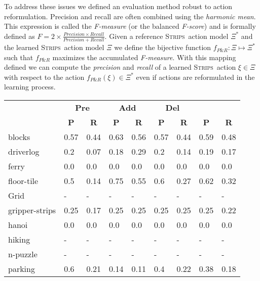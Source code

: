 \documentclass{article}
\newcommand{\strips}{\textsc{Strips}}     %
\begin{document}
To address these issues we defined an evaluation method robust to action reformulation. Precision and recall are often combined using the {\em harmonic mean}. This expression is called the {\em F-measure} (or the balanced {\em F-score}) and is formally defined as $F=2\times\frac{Precision\times Recall}{Precision+Recall}$. Given a reference \strips\ action model $\Xi^*$ and the learned \strips\ action model $\Xi$ we define the bijective function $f_{P\&R}:\Xi \mapsto \Xi^*$ such that $f_{P\&R}$ maximizes the accumulated {\em F-measure}. With this mapping defined we can compute the {\em precision} and {\em recall} of a learned \strips\ action $\xi\in\Xi$ with respect to the action $f_{P\&R}(\xi)\in \Xi^*$ even if actions are reformulated in the learning process.

\begin{table}
	\begin{center}
		\begin{scriptsize}                
			\begin{tabular}{l|l|l|l|l|l|l||l|l|}
				& \multicolumn{2}{|c|}{\bf Pre} & \multicolumn{2}{|c|}{\bf Add} & \multicolumn{2}{|c||}{\bf Del} & \multicolumn{2}{|c}{\bf}\\ \cline{2-9}			
				& \multicolumn{1}{|c|}{\bf P} & \multicolumn{1}{|c|}{\bf R} & \multicolumn{1}{|c|}{\bf P} & \multicolumn{1}{|c|}{\bf R} & \multicolumn{1}{|c|}{\bf P} & \multicolumn{1}{|c||}{\bf R} &  \multicolumn{1}{|c|}{\bf P} & \multicolumn{1}{|c|}{\bf R} \\
				\hline
				blocks & 0.57 & 0.44 & 0.63 & 0.56 & 0.57 & 0.44 & 0.59 & 0.48 \\
				driverlog & 0.2 & 0.07 & 0.18 & 0.29 & 0.2 & 0.14 & 0.19 & 0.17 \\
				ferry & 0.0 & 0.0 & 0.0 & 0.0 & 0.0 & 0.0 & 0.0 & 0.0 \\
				floor-tile & 0.5 & 0.14 & 0.75 & 0.55 & 0.6 & 0.27 & 0.62 & 0.32 \\
				Grid & - & - & - & - & - & - & - & - \\ %
				gripper-strips & 0.25 & 0.17 & 0.25 & 0.25 & 0.25 & 0.25 & 0.25 & 0.22 \\
				hanoi & 0.0 & 0.0 & 0.0 & 0.0 & 0.0 & 0.0 & 0.0 & 0.0 \\
				hiking & - & - & - & - & - & - & - & - \\ %
				n-puzzle & - & - & - & - & - & - & - & - \\ %
				parking & 0.6 & 0.21 & 0.14 & 0.11 & 0.4 & 0.22 & 0.38 & 0.18 \\

\end{tabular}
\end{scriptsize}
\end{center}
\end{table}
\end{document}

